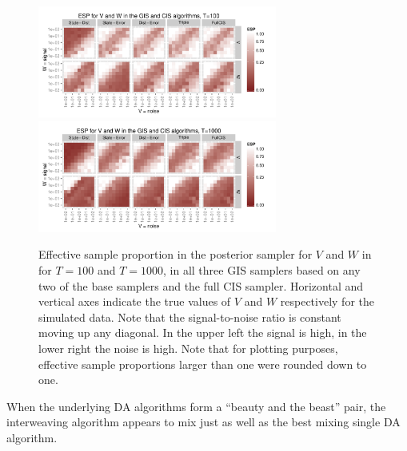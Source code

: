 \documentclass{article}
\begin{document}
\begin{figure}[!ht]
\centering
\includegraphics[width=0.7\textwidth]{intESplot1}
\includegraphics[width=0.7\textwidth]{intESplot2}
\caption{Effective sample proportion in the posterior sampler for $V$ and $W$ in for $T=100$ and $T=1000$, in all three GIS samplers based on any two of the base samplers and the full CIS sampler. Horizontal and vertical axes indicate the true values of $V$ and $W$ respectively for the simulated data. Note that the signal-to-noise ratio is constant moving up any diagonal. In the upper left the signal is high, in the lower right the noise is high. Note that for plotting purposes, effective sample proportions larger than one were rounded down to one.}
\label{intESplot}
\end{figure}



When the underlying DA algorithms form a ``beauty and the beast'' pair, the interweaving algorithm appears to mix just as well as the best mixing single DA algorithm. 
\end{document}
